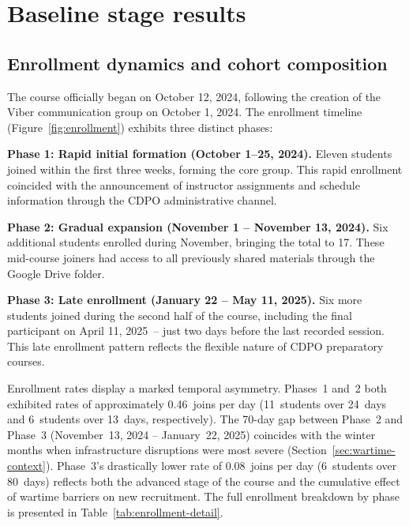  \label{ch:results}

\section{Baseline stage results} \label{sec:baseline}

\subsection{Enrollment dynamics and cohort composition}

The course officially began on October 12, 2024, following the creation of the Viber communication group on October 1, 2024. The enrollment timeline (Figure~\ref{fig:enrollment}) exhibits three distinct phases:

\textbf{Phase 1: Rapid initial formation (October 1--25, 2024).} Eleven students joined within the first three weeks, forming the core group. This rapid enrollment coincided with the announcement of instructor assignments and schedule information through the CDPO administrative channel.

\textbf{Phase 2: Gradual expansion (November 1 -- November 13, 2024).} Six additional students enrolled during November, bringing the total to 17. These mid-course joiners had access to all previously shared materials through the Google Drive folder.

\textbf{Phase 3: Late enrollment (January 22 -- May 11, 2025).} Six more students joined during the second half of the course, including the final participant on April 11, 2025~-- just two days before the last recorded session. This late enrollment pattern reflects the flexible nature of CDPO preparatory courses.

Enrollment rates display a marked temporal asymmetry. Phases~1 and~2 both exhibited rates of approximately 0.46~joins per day (11~students over 24~days and 6~students over 13~days, respectively). The 70-day gap between Phase~2 and Phase~3 (November~13, 2024 -- January~22, 2025) coincides with the winter months when infrastructure disruptions were most severe (Section~\ref{sec:wartime-context}). Phase~3's drastically lower rate of 0.08~joins per day (6~students over 80~days) reflects both the advanced stage of the course and the cumulative effect of wartime barriers on new recruitment. The full enrollment breakdown by phase is presented in Table~\ref{tab:enrollment-detail}.

